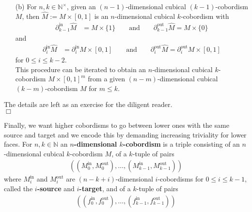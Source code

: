 \begin{exa}
\begin{enumerate}
\item[(b)]
For $n,k \in \mathbb{N}^{\times}$, given an $(n-1)$-dimensional cubical $(k-1)$-cobordism $M$, then $\hat{M} := M \times [0,1]$ is an $n$-dimensional cubical $k$-cobordism with
\begin{align*}
  \partial_{k-1}^{\mathrm{in}}
  \hat{M}
  &=
  M
  \times
  \lbrace
    1
  \rbrace
  \qquad
  \text{and}
  \qquad
  \partial_{k-1}^{\mathrm{out}}
  \hat{M}
  =
  M
  \times
  \lbrace
    0
  \rbrace
\end{align*}
and
\begin{align*}
  \partial_{i}^{\mathrm{in}}
  \hat{M}
  &=
  \partial_{i}^{\mathrm{in}}
  M
  \times
  [0,1]
  \qquad
  \text{and}
  \qquad
  \partial_{i}^{\mathrm{out}}
  \hat{M}
  =
  \partial_{i}^{\mathrm{out}}
  M
  \times
  [0,1]
\end{align*}
for $0 \leq i \leq k-2$.
\\
This procedure can be iterated to obtain an $n$-dimensional cubical $k$-cobordism $M \times [0,1]^{m}$ from a given $(n-m)$-dimensional cubical $(k-m)$-cobordism $M$ for $m \leq k$.
\end{enumerate}
\end{exa}
\begin{prf}
The details are left as an exercise for the diligent reader.
\\
\phantom{proven}
\hfill
$\Box$
\end{prf}
Finally, we want higher cobordisms to go between lower ones with the same source and target and we encode this by demanding increasing triviality for lower faces. For $n,k \in \mathbb{N}$ an \textbf{$n$-dimensional $k$-cobordism} is a triple consisting of an $n$-dimensional cubical $k$-cobordism $M$, of a $k$-tuple of pairs
\begin{align*}
  \left(
    \left(
      M_{0}^{\mathrm{in}}
      ,
      M_{0}^{\mathrm{out}}
    \right)
    ,
    \ldots
    ,
    \left(
      M_{k-1}^{\mathrm{in}}
      ,
      M_{k-1}^{\mathrm{out}}
    \right)
  \right)
\end{align*}
where $M_{i}^{\mathrm{in}}$ and $M_{i}^{\mathrm{out}}$ are $(n-k+i)$-dimensional $i$-cobordisms for $0 \leq i \leq k-1$, called the \textbf{$i$-source} and \textbf{$i$-target}, and of a $k$-tuple of pairs
\begin{align*}
  \left(
    \left(
      f_{0}^{\mathrm{in}}
      ,
      f_{0}^{\mathrm{out}}
    \right)
    ,
    \ldots
    ,
    \left(
      f_{k-1}^{\mathrm{in}}
      ,
      f_{k-1}^{\mathrm{out}}
    \right)
  \right)
\end{align*}
